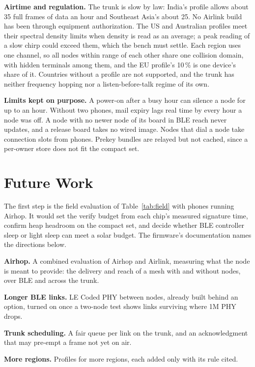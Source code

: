 \documentclass[conference]{IEEEtran}
\begin{document}
\textbf{Airtime and regulation.} The trunk is slow by law: India's profile allows about 35 full frames of data an hour and Southeast Asia's about 25. No Airlink build has been through equipment authorization. The US and Australian profiles meet their spectral density limits when density is read as an average; a peak reading of a slow chirp could exceed them, which the bench must settle. Each region uses one channel, so all nodes within range of each other share one collision domain, with hidden terminals among them, and the EU profile's 10\,\% is one device's share of it. Countries without a profile are not supported, and the trunk has neither frequency hopping nor a listen-before-talk regime of its own.

\textbf{Limits kept on purpose.} A power-on after a busy hour can silence a node for up to an hour. Without two phones, mail expiry lags real time by every hour a node was off. A node with no newer node of its board in BLE reach never updates, and a release board takes no wired image. Nodes that dial a node take connection slots from phones. Prekey bundles are relayed but not cached, since a per-owner store does not fit the compact set.

\section{Future Work}
\label{sec:future}

The first step is the field evaluation of Table~\ref{tab:field} with phones running Airhop. It would set the verify budget from each chip's measured signature time, confirm heap headroom on the compact set, and decide whether BLE controller sleep or light sleep can meet a solar budget. The firmware's documentation names the directions below.

\textbf{Airhop.} A combined evaluation of Airhop and Airlink, measuring what the node is meant to provide: the delivery and reach of a mesh with and without nodes, over BLE and across the trunk.

\textbf{Longer BLE links.} LE Coded PHY between nodes, already built behind an option, turned on once a two-node test shows links surviving where 1M PHY drops.

\textbf{Trunk scheduling.} A fair queue per link on the trunk, and an acknowledgment that may pre-empt a frame not yet on air.

\textbf{More regions.} Profiles for more regions, each added only with its rule cited.
\end{document}
